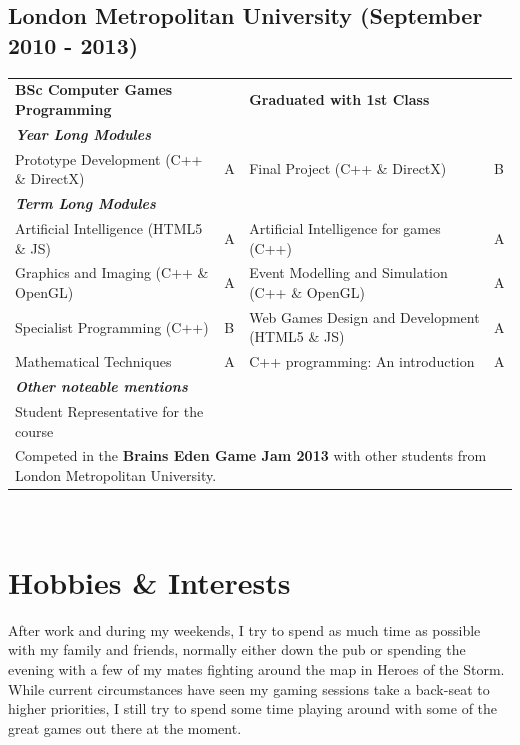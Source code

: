 \documentclass{article}
\begin{document}
\subsection*{}
\vspace{-3mm}
\subsection*{London Metropolitan University (September 2010 - 2013)}
\begin{tabular}{ p{} p{} p{} p{} }
	\textbf{BSc Computer Games Programming} 	& 		&	\textbf{Graduated with 1st Class} \\ 
	\bf{\emph{Year Long Modules}} \\
	Prototype Development (C++ \& DirectX)	&	A 	&	Final Project (C++ \& DirectX)	&	B \\ 
	\bf{\emph{Term Long Modules}} \\
	Artificial Intelligence (HTML5 \& JS)		& 	A 	&	Artificial Intelligence for games (C++) &		A \\
	Graphics and Imaging (C++ \& OpenGL)	& A	& Event Modelling and Simulation (C++ \& OpenGL)	& A \\
	Specialist Programming (C++)		& B	& Web Games Design and Development (HTML5 \& JS)	& A \\
	Mathematical Techniques	&	A	& C++ programming: An introduction		& A \\
	\bf{\emph{Other noteable mentions}} \\
	Student Representative for the course \\
	\multicolumn{4}{l}{Competed in the {\bf \large Brains Eden Game Jam 2013} with other students from London Metropolitan University.} \\
\end{tabular}  \\
\vspace{-6mm}
\section*{Hobbies \& Interests}
\vspace{-3mm}
After work and during my weekends, I try to spend as much time as possible with my family and friends, normally either down the pub or spending the evening with a few of my mates fighting around the map in Heroes of the Storm. While current circumstances have seen my gaming sessions take a back-seat to higher priorities, I still try to spend some time playing around with some of the great games out there at the moment.
\end{document}
